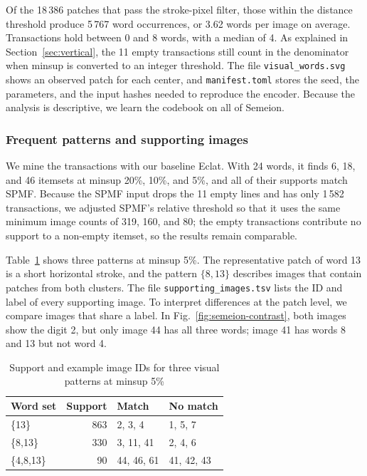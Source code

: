 Of the 18\,386 patches that pass the stroke-pixel filter, those within the distance
threshold produce 5\,767 word occurrences, or 3.62 words per image on average.
Transactions hold between 0 and 8 words, with a median of 4. As explained in
Section~\ref{sec:vertical}, the 11 empty transactions still count in the denominator when
minsup is converted to an integer threshold. The file \texttt{visual\_words.svg} shows an
observed patch for each center, and \texttt{manifest.toml} stores the seed, the
parameters, and the input hashes needed to reproduce the encoder. Because the analysis is
descriptive, we learn the codebook on all of Semeion.

\subsubsection{Frequent patterns and supporting images}
We mine the transactions with our baseline Eclat. With 24 words, it finds 6, 18, and 46
itemsets at minsup 20\%, 10\%, and 5\%, and all of their supports match SPMF. Because the
SPMF input drops the 11 empty lines and has only 1\,582 transactions, we adjusted SPMF's
relative threshold so that it uses the same minimum image counts of 319, 160, and 80; the
empty transactions contribute no support to a non-empty itemset, so the results remain
comparable.

Table~\ref{tab:image-evidence} shows three patterns at minsup 5\%. The representative
patch of word 13 is a short horizontal stroke, and the pattern $\{8,13\}$ describes images
that contain patches from both clusters. The file \texttt{supporting\_images.tsv} lists
the ID and label of every supporting image. To interpret differences at the patch level,
we compare images that share a label. In Fig.~\ref{fig:semeion-contrast}, both images
show the digit 2, but only image 44 has all three words; image 41 has words 8 and 13 but
not word 4.

\begin{table}[ht]
\centering
\caption{Support and example image IDs for three visual patterns at minsup 5\%}
\label{tab:image-evidence}
\begin{tabular}{l r l l}
\hline
Word set & Support & Match & No match \\
\hline
\{13\} & 863 & 2, 3, 4 & 1, 5, 7 \\
\{8,13\} & 330 & 3, 11, 41 & 2, 4, 6 \\
\{4,8,13\} & 90 & 44, 46, 61 & 41, 42, 43 \\
\hline
\end{tabular}
\end{table}

